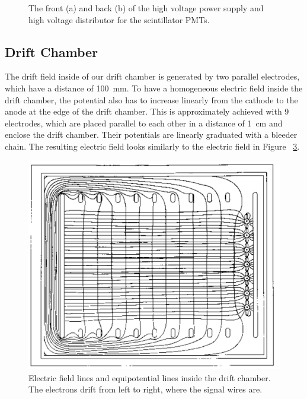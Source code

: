 \documentclass[12pt]{article}
\begin{document}
\begin{figure}
\begin{subfigure}[b]{0.8\textwidth}
			\caption{}
			\label{fig:distributor}
		\end{subfigure}
\caption{The front (a)  and back (b) of the high voltage power supply and high voltage distributor for the scintillator PMTs.}
\end{figure}



\subsection{Drift Chamber}
\label{measurementsetupdriftchamber}

The drift field inside of our drift chamber is generated by two parallel electrodes, which have a distance of \SI{100}{\milli\meter}. To have a homogeneous electric field inside the drift chamber, the potential also has to increase linearly from the cathode to the anode at the edge of the drift chamber. This is approximately achieved with 9 electrodes, which are placed parallel to each other in a distance of \SI{1}{\centi\meter} and enclose the drift chamber. Their potentials are linearly graduated with a bleeder chain. The resulting electric field looks similarly to the electric field in Figure~ \ref{fig:potential}.

\begin{figure}[h]
\includegraphics[width=13cm]{pics/Potential}
\centering
\caption{Electric field lines and equipotential lines inside the drift chamber. The electrons drift from left to right, where the signal wires are.}
\label{fig:potential}
\end{figure}
 
\end{document}
